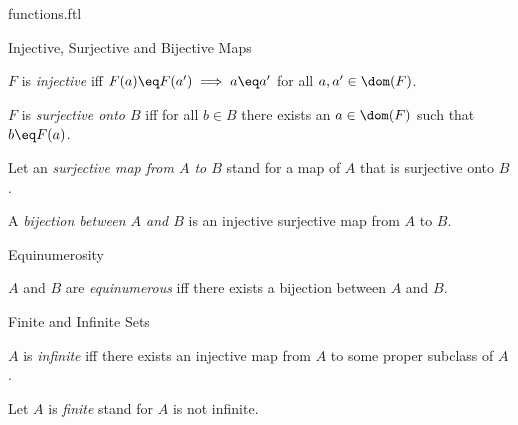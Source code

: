 \documentclass{naproche-library}
\begin{document}
\begin{smodule}[title=Functions and Maps]{functions.ftl}
\begin{sfragment}{Injective, Surjective and Bijective Maps}
  \begin{definition}[forthel,id=InjectionDef]
    $F$ is \emph{injective} iff $F(a)\eq F(a')\implies a\eq a'$ for all $a,a'\in\dom(F)$.
  \end{definition}

  \begin{definition}[forthel,id=SurjectionDef]
    $F$ is \emph{surjective onto $B$} iff for all $b\in B$ there exists an $a\in\dom(F)$ such that $b\eq F(a)$.

    Let an \emph{surjective map from $A$ to $B$} stand for a map of $A$ that is surjective onto $B$.
  \end{definition}

  \begin{definition}[forthel,id=BijectionDef]
    A \emph{bijection between $A$ and $B$} is an injective surjective map from $A$ to $B$.
  \end{definition}
\end{sfragment}

\begin{sfragment}{Equinumerosity}
  \begin{definition}[forthel,id=EquinumerousDef]
    $A$ and $B$ are \emph{equinumerous} iff there exists a bijection between $A$ and $B$.
  \end{definition}
\end{sfragment}

\begin{sfragment}{Finite and Infinite Sets}
  \begin{definition}[forthel,id=InfiniteDef]
    $A$ is \emph{infinite} iff there exists an injective map from $A$ to some proper subclass of $A$.

    Let $A$ is \emph{finite} stand for $A$ is not infinite.
  \end{definition}
\end{sfragment}
\end{smodule}
\end{document}
